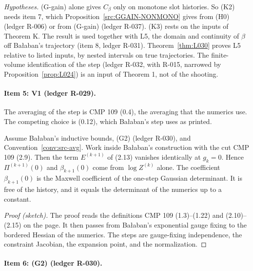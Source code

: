 \emph{Hypotheses.} (G-gain) alone gives $C_\beta$ only on monotone slot histories. So (K2) needs item 7, which Proposition~\ref{src:GGAIN-NONMONO} gives from (H0) (ledger R-006) or from (G-gain) (ledger R-037). (K3) rests on the inputs of Theorem K. The result is used together with L5, the domain and continuity of $\beta$ off Ba{\l}aban's trajectory (item 8, ledger R-031). Theorem~\ref{thm:L030} proves L5 relative to listed inputs, by nested intervals on true trajectories. The finite-volume identification of the step (ledger R-032, with R-015, narrowed by Proposition~\ref{prop:L024}) is an input of Theorem 1, not of the shooting.

\paragraph{Item 5: V1 (ledger R-029).}

\begin{convention}\label{conv:src-avg}
The averaging of the step is CMP 109 (0.4), the averaging that the numerics use. The competing choice is (0.12), which Ba{\l}aban's step uses as printed.
\end{convention}

\begin{proposition}\label{src:T2-V1}
Assume Ba{\l}aban's inductive bounds, (G2) (ledger R-030), and Convention~\ref{conv:src-avg}. Work inside Ba{\l}aban's construction with the cut CMP 109 (2.9). Then the term $E^{(k+1)}$ of (2.13) vanishes identically at $g_k=0$. Hence $\Pi^{(k+1)}(0)$ and $\beta_{k+1}(0)$ come from $\log Z^{(k)}$ alone. The coefficient $\beta_{k+1}(0)$ is the Maxwell coefficient of the one-step Gaussian determinant. It is free of the history, and it equals the determinant of the numerics up to a constant.
\end{proposition}

\begin{proof}[Proof (sketch)]
The proof reads the definitions CMP 109 (1.3)--(1.22) and (2.10)--(2.15) on the page. It then passes from Ba{\l}aban's exponential gauge fixing to the bordered Hessian of the numerics. The steps are gauge-fixing independence, the constraint Jacobian, the expansion point, and the normalization.
\end{proof}

\paragraph{Item 6: (G2) (ledger R-030).}

